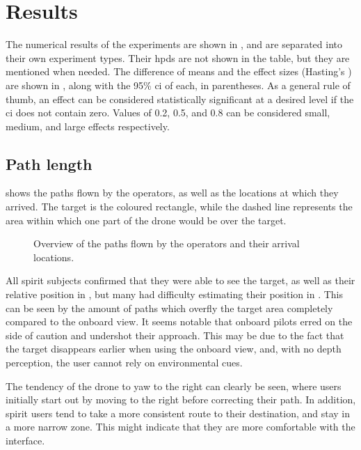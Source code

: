 \chapter{Results}
\label{ch:results}
The numerical results of the experiments are shown in , and are separated into their own experiment types.
Their \glspl{hpd} are not shown in the table, but they are mentioned when needed.
The difference of means and the effect sizes (Hasting's ) are shown in , along with the 95\% \gls{ci} of each, in parentheses.
As a general rule of thumb, an effect can be considered statistically significant at a desired level if the \gls{ci} does not contain zero.
Values of 0.2, 0.5, and 0.8 can be considered small, medium, and large effects respectively.

  \section{Path length}
   shows the paths flown by the operators, as well as the locations at which they arrived.
  The target is the coloured rectangle, while the dashed line represents the area within which one part of the drone would be over the target.

  \begin{figure}[h]
    \centering
    
    \caption[Paths overview]{Overview of the paths flown by the operators and their arrival locations.}
    \label{fig:paths_overview}
  \end{figure}

  All \gls{spirit} subjects confirmed that they were able to see the target, as well as their relative position in , but many had difficulty estimating their position in .
  This can be seen by the amount of paths which overfly the target area completely compared to the onboard view.
  It seems notable that onboard pilots erred on the side of caution and undershot their approach.
  This may be due to the fact that the target disappears earlier when using the onboard view, and, with no depth perception, the user cannot rely on environmental cues.

  The tendency of the drone to yaw to the right can clearly be seen, where users initially start out by moving to the right before correcting their path.
  In addition, \gls{spirit} users tend to take a more consistent route to their destination, and stay in a more narrow zone.
  This might indicate that they are more comfortable with the interface.

